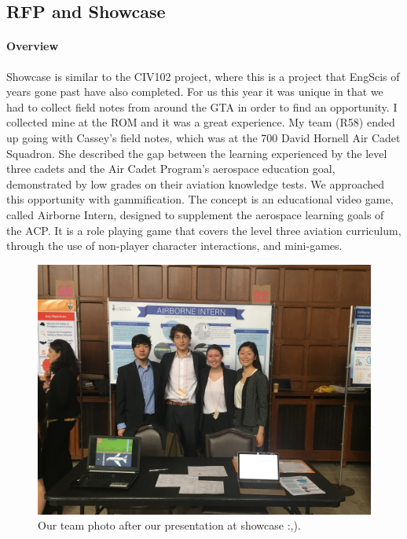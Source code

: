\documentclass[paper=a4, fontsize=11pt]{article} %
\begin{document}
    \subsection{RFP and Showcase}
        \paragraph{Overview}
        Showcase is similar to the CIV102 project, where this is a project that EngScis of years gone past have also completed. For us this year it was unique in that we had to collect field notes from around the GTA in order to find an opportunity. I collected mine at the ROM and it was a great experience. My team (R58) ended up going with Cassey's field notes, which was at the 700 David Hornell Air Cadet Squadron. She described the gap between the learning experienced by the level three cadets and the Air Cadet Program’s aerospace education goal, demonstrated by low grades on their aviation knowledge tests. We approached this opportunity with gammification. The concept is an educational video game, called Airborne Intern, designed to supplement the aerospace learning goals of the ACP. It is a role playing game that covers the level three aviation curriculum, through the use of non-player character interactions, and mini-games. 
       \begin{figure}[H]
            \centering
            \includegraphics[width=0.6\linewidth]{praxis23.jpg}
            \caption{Our team photo after our presentation at showcase :,).}
        \end{figure}
\end{document}

